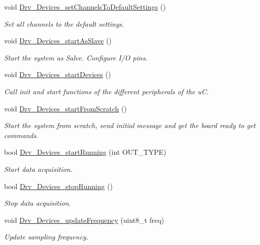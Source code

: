 \begin{DoxyCompactItemize}
void \hyperlink{group__Devices__Library_gaa48520ff061081dab8c49d26bf9404dd}{Drv\+\_\+\+Devices\+\_\+set\+Channels\+To\+Default\+Settings} ()
\begin{DoxyCompactList}\small\item\em Set all channels to the default settings. \end{DoxyCompactList}\item 
void \hyperlink{group__Devices__Library_ga7a5e2ac941ca1d1f308f910539005d4b}{Drv\+\_\+\+Devices\+\_\+start\+As\+Slave} ()
\begin{DoxyCompactList}\small\item\em Start the system as Salve. Configure I/O pins. \end{DoxyCompactList}\item 
void \hyperlink{group__Devices__Library_ga752ca1b164444c691ffe54ed89d848c8}{Drv\+\_\+\+Devices\+\_\+start\+Devices} ()
\begin{DoxyCompactList}\small\item\em Call init and start functions of the different peripherals of the uC. \end{DoxyCompactList}\item 
void \hyperlink{group__Devices__Library_ga43e0b770fd7ccd57b3f0d5ddf0eda4be}{Drv\+\_\+\+Devices\+\_\+start\+From\+Scratch} ()
\begin{DoxyCompactList}\small\item\em Start the system from scratch, send initial message and get the board ready to get commands. \end{DoxyCompactList}\item 
bool \hyperlink{group__Devices__Library_ga7f4ddcd86724d8aad896ff12e43146ca}{Drv\+\_\+\+Devices\+\_\+start\+Running} (int O\+U\+T\+\_\+\+T\+Y\+PE)
\begin{DoxyCompactList}\small\item\em Start data acquisition. \end{DoxyCompactList}\item 
bool \hyperlink{group__Devices__Library_ga8584f49a773b7e9add0e51bb0057fb54}{Drv\+\_\+\+Devices\+\_\+stop\+Running} ()
\begin{DoxyCompactList}\small\item\em Stop data acquisition. \end{DoxyCompactList}\item 
void \hyperlink{group__Devices__Library_ga2d56cab48a0548365790822b78afa02d}{Drv\+\_\+\+Devices\+\_\+update\+Frequency} (uint8\+\_\+t freq)
\begin{DoxyCompactList}\small\item\em Update sampling frequency. \end{DoxyCompactList}\item 

\end{DoxyCompactItemize}
